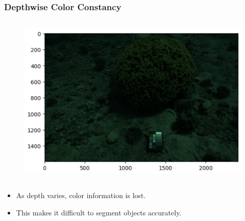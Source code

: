 \begin{frame}
    \frametitle{Depthwise Color Constancy}
    \begin{columns}
        \begin{column}{0.5\textwidth}
            \begin{figure}
                \includegraphics[width=\linewidth]{images/depth_color_issue.png}
            \end{figure}
        \end{column}    
    \end{columns}
    \begin{itemize}
        \item As depth varies, color information is lost.
        \item This makes it difficult to segment objects accurately.
    \end{itemize}
\end{frame}

